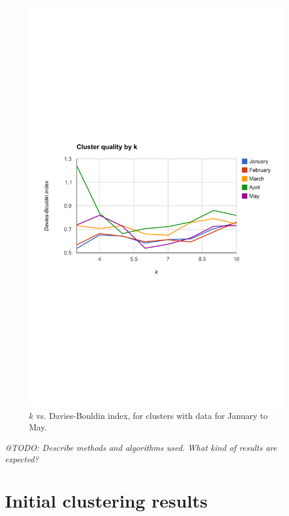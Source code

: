 \begin{figure}[h]
  \centering
    \includegraphics[width=\textwidth]{Figures/plots/k-vs-db/jan-may}
    \caption{$k$ vs. Davies-Bouldin index, for clusters with data for January to May.}
    \label{fig:k_vs_db}
\end{figure}

\emph{@TODO: Describe methods and algorithms used. What kind of results are expected?}




\section{Initial clustering results}
\label{eval:sec:clustering_results}


